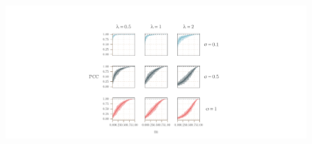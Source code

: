 \documentclass[]{article}
\begin{document}
\begin{figure}
    \includegraphics[width=15cm]{figs/figure5}
    \caption{}
    \label{}
\end{figure}


\clearpage
{
\footnotesize

}
\end{document}
